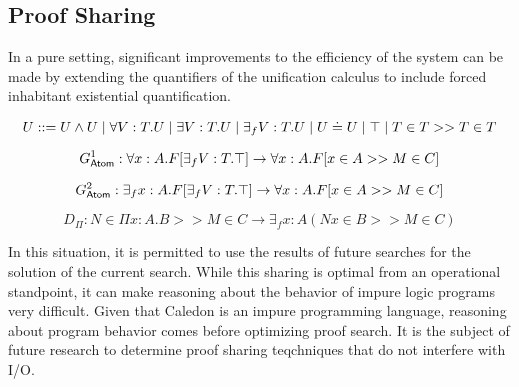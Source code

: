 \subsection{Proof Sharing}

In a pure setting, significant improvements to the efficiency of the system can be made by 
extending the quantifiers of the unification calculus to include forced inhabitant existential quantification.

\[
U ::= U \wedge U 
 \; | \; \forall V : T . U
 \; | \; \exists V : T . U 
 \; | \; \exists_f V : T . U 
 \; | \; U \doteq U
 \; | \; \top
 \; | \; T \in T >> T \in T
\]

\[
G^1_{\mathsf{Atom}} : \forall x : A . F[\exists_f V : T . \top]  \rightarrow \forall x : A . F[x \in A >> M \in C]
\]

\[
G^2_{\mathsf{Atom}} : \exists_f x : A . F[\exists_f V : T . \top]  \rightarrow \forall x : A . F[x \in A >> M \in C]
\]

\[
D_\Pi : N\in \Pi x : A . B >> M \in C \rightarrow \exists_f x : A ( N x \in B >> M \in C)
\]

In this situation, it is permitted to use the results of future searches for the solution of the current search.
While this sharing is optimal from an operational standpoint, it can make reasoning about the behavior 
of impure logic programs very difficult.  Given that Caledon is an impure programming language, reasoning about program
behavior comes before optimizing proof search.  It is the subject of future research to determine proof sharing teqchniques
that do not interfere with I/O. 






